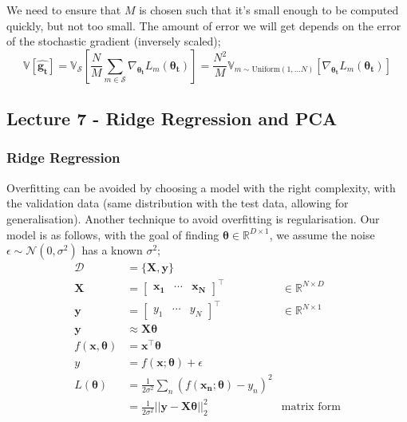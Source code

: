 \documentclass[a4paper, 12pt]{article}
\newcommand{\summation}[2]{\sum\limits_{#1}^{#2}}
\newcommand{\mat}[1]{\boldsymbol{#1}}
\renewcommand{\vec}[1]{\boldsymbol{#1}}
\newcommand{\mbbr}[0]{\mathbb{R}}
\begin{document}
                We need to ensure that $M$ is chosen such that it's small enough to be computed quickly, but not too small.
                The amount of error we will get depends on the error of the stochastic gradient (inversely scaled);
                $$\mathbb{V}[\hat{\mat{g_t}}] = \mathbb{V}_\mathcal{S}\left[\frac{N}{M} \summation{m \in \mathcal{S}}{} \nabla_{\mat{\theta_t}} L_m(\mat{\theta_t})\right] = \frac{N^2}{M} \mathbb{V}_{m \sim \text{Uniform}(1, \dots N)}[\nabla_{\mat{\theta_t}} L_m(\mat{\theta_t})]$$
        \subsection*{Lecture 7 - Ridge Regression and PCA}
            \subsubsection*{Ridge Regression}
                Overfitting can be avoided by choosing a model with the right complexity, with the validation data (same distribution with the test data, allowing for generalisation).
                Another technique to avoid overfitting is regularisation.
                Our model is as follows, with the goal of finding $\mat{\theta} \in \mbbr^{D \times 1}$, we assume the noise $\epsilon \sim \mathcal{N}(0, \sigma^2)$ has a known $\sigma^2$;
                \begin{align*}
                    \mathcal{D} & = \{ \mat{X}, \mat{y} \} \\
                    \mat{X} & = \begin{bmatrix}
                        \vec{x_1} & \cdots & \vec{x_N}
                    \end{bmatrix}^\top & \in \mbbr^{N \times D} \\
                    \mat{y} & = \begin{bmatrix}
                        y_1 & \cdots & y_N
                    \end{bmatrix}^\top & \in \mbbr^{N \times 1} \\
                    \mat{y} & \approx \mat{X}\mat{\theta} \\
                    f(\mat{x}, \mat{\theta}) & = \mat{x}^\top\mat{\theta} \\
                    y & = f(\mat{x}; \mat{\theta}) + \epsilon \\
                    L(\mat{\theta}) & = \frac{1}{2\sigma^2} \summation{n}{} (f(\mat{x_n}; \mat{\theta}) - y_n)^2 \\
                    & = \frac{1}{2 \sigma^2} || \mat{y} - \mat{X}\mat{\theta} ||_2^2 & \text{matrix form}
                \end{align*}
\end{document}
